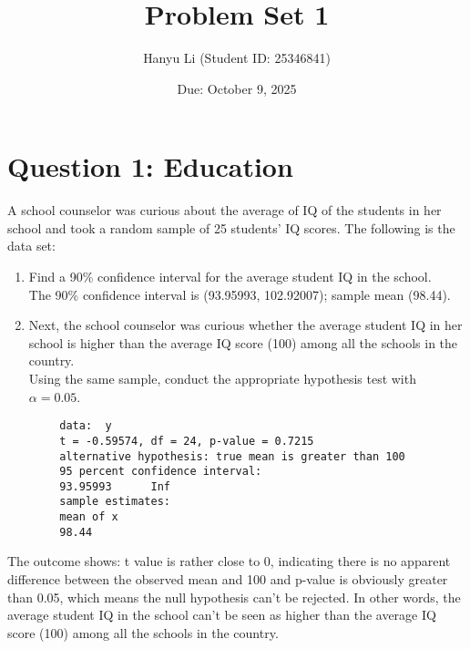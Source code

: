 \documentclass[12pt,letterpaper]{article}
\title{Problem Set 1}
\date{Due: October 9, 2025}
\author{Hanyu Li (Student ID: 25346841)}
\begin{document}
	\maketitle
	
	\section*{Question 1: Education}
	
	A school counselor was curious about the average of IQ of the students in her school and took a random sample of 25 students' IQ scores. The following is the data set:
	
	\vspace{.5cm}
	
	  
	
	\vspace{1cm}
	
	\begin{enumerate}
		\item Find a 90\% confidence interval for the average student IQ in the school.\\
		
		 
		
		The 90\% confidence interval is (93.95993, 102.92007); sample mean (98.44).
		
		\item Next, the school counselor was curious whether the average student IQ in her school is higher than the average IQ score (100) among all the schools in the country.\\ 
		
		\noindent Using the same sample, conduct the appropriate hypothesis test with $\alpha=0.05$.
	\end{enumerate}
	
	
	
	\begin{verbatim}
		data:  y
		t = -0.59574, df = 24, p-value = 0.7215
		alternative hypothesis: true mean is greater than 100
		95 percent confidence interval:
		93.95993      Inf
		sample estimates:
		mean of x 
		98.44 
	\end{verbatim} 
	
	The outcome shows: t value is rather close to 0, indicating there is no apparent difference between the observed mean and 100 and p-value is obviously greater than 0.05, which means the null hypothesis can't be rejected. In other words, the average student IQ in the school can't be seen as higher than the average IQ score (100) among all the schools in the country.
	
\end{document}
